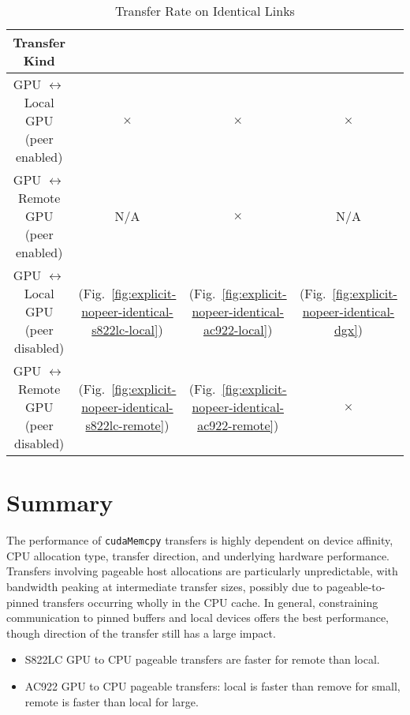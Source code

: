 \begin{table}[ht]
	\centering
	\caption[Transfer rate on Identical Links]{Transfer Rate on Identical Links}
	\label{tab:explicit}
	\begin{tabular}{cccc}
		\hline
		\textbf{Transfer Kind}                      \\ \hline 
		\makecell{ GPU $\leftrightarrow$ Local GPU  \\ (peer enabled)  } & $\times$                                                            & $\times$                                                           & $\times$                                                  \\ \hline
		\makecell{ GPU $\leftrightarrow$ Remote GPU \\ (peer enabled)  } & N/A                                                                 & $\times$                                                           & N/A                                                       \\ \hline
		\makecell{ GPU $\leftrightarrow$ Local GPU  \\ (peer disabled) } & \checkmark (Fig.~\ref{fig:explicit-nopeer-identical-s822lc-local})  & \checkmark (Fig.~\ref{fig:explicit-nopeer-identical-ac922-local})  & \checkmark (Fig.~\ref{fig:explicit-nopeer-identical-dgx}) \\ \hline
		\makecell{ GPU $\leftrightarrow$ Remote GPU \\ (peer disabled) } & \checkmark (Fig.~\ref{fig:explicit-nopeer-identical-s822lc-remote}) & \checkmark (Fig.~\ref{fig:explicit-nopeer-identical-ac922-remote}) & $\times$                                                  \\ \hline
	\end{tabular}
\end{table}

\section{Summary}

The performance of \texttt{cudaMemcpy} transfers is highly dependent on device affinity, CPU allocation type, transfer direction, and underlying hardware performance.
Transfers involving pageable host allocations are particularly unpredictable, with bandwidth peaking at intermediate transfer sizes, possibly due to pageable-to-pinned transfers occurring wholly in the CPU cache.
In general, constraining communication to pinned buffers and local devices offers the best performance, though direction of the transfer still has a large impact.

\begin{itemize}
	\item S822LC GPU to CPU pageable transfers are faster for remote than local.
	\item AC922 GPU to CPU pageable transfers: local is faster than remove for small, remote is faster than local for large.
\end{itemize}
